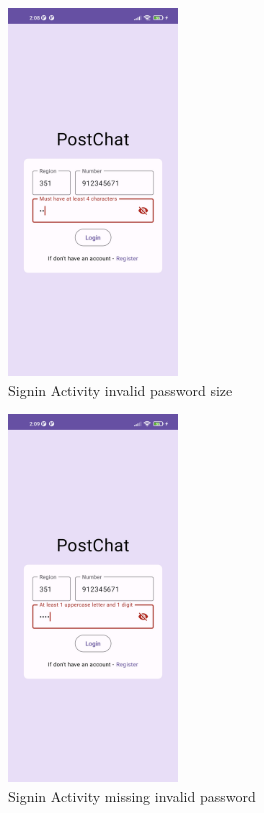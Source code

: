 \begin{figure}[!ht]
	\centering
	\includegraphics[trim={0cm -3cm 0 -3cm}, width=0.4\textwidth]{./Chapter6/Figures/Login Invalid Password 1}
	\caption{Signin Activity invalid password size}
	\label{fig:SA2}
\end{figure}

\newpage


\begin{figure}[!ht]
	\centering
	\includegraphics[trim={0cm -3cm 0 -3cm}, width=0.4\textwidth]{./Chapter6/Figures/Login Invalid Password 2}
	\caption{Signin Activity missing invalid password}
	\label{fig:SA3}
\end{figure}

